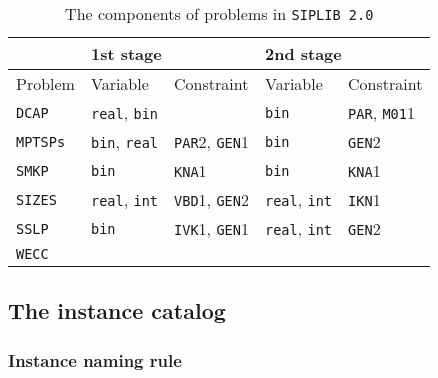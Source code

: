\begin{table}[H]
	\centering
	\caption{The components of problems in \texttt{SIPLIB 2.0}}
	\label{table:prob_class}
	\begin{tabular}{@{}lllll@{}}
		\toprule
		& \multicolumn{2}{l}{1st stage}                              & \multicolumn{2}{l}{2nd stage}                             \\ \midrule
		Problem & Variable                    & Constraint                   & Variable                    & Constraint                  \\ \midrule
		\texttt{DCAP}    & \texttt{real}, \texttt{bin} &                              & \texttt{bin}                & \texttt{PAR}, \texttt{M01}1 \\
		\texttt{MPTSPs}  & \texttt{bin}, \texttt{real} & \texttt{PAR}2, \texttt{GEN}1 & \texttt{bin}                & \texttt{GEN}2               \\
		\texttt{SMKP}    & \texttt{bin}                & \texttt{KNA}1                & \texttt{bin}                & \texttt{KNA}1               \\
		\texttt{SIZES}   & \texttt{real}, \texttt{int} & \texttt{VBD}1, \texttt{GEN}2 & \texttt{real}, \texttt{int} & \texttt{IKN}1               \\
		\texttt{SSLP}    & \texttt{bin}                & \texttt{IVK}1, \texttt{GEN}1 & \texttt{real}, \texttt{int} & \texttt{GEN}2               \\
		\texttt{WECC}    &                             &                              &                             &                             \\ \bottomrule
	\end{tabular}

\end{table}

\subsection{The instance catalog}

\subsubsection{Instance naming rule}

